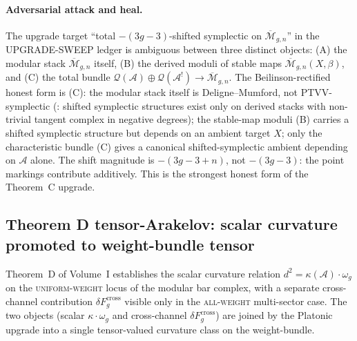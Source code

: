 \documentclass[11pt]{article}
\begin{document}
\paragraph{Adversarial attack and heal.} The upgrade target ``total
$-(3g{-}3)$-shifted symplectic on $\overline{\mathcal{M}}_{g,n}$''
in the UPGRADE-SWEEP ledger is ambiguous between three distinct
objects: (A) the modular stack $\overline{\mathcal{M}}_{g,n}$
itself, (B) the derived moduli of stable maps
$\overline{\mathcal{M}}_{g,n}(X, \beta)$, and (C) the total bundle
$\mathcal{Q}(\mathcal{A}) \oplus \mathcal{Q}(\mathcal{A}^!) \to
\overline{\mathcal{M}}_{g,n}$. The Beilinson-rectified honest form
is (C): the modular stack itself is Deligne--Mumford, not
PTVV-symplectic (\cite[Rem.~2.7]{PTVV13}: shifted symplectic
structures exist only on derived stacks with non-trivial tangent
complex in negative degrees); the stable-map moduli (B) carries
a shifted symplectic structure but depends on an ambient target
$X$; only the characteristic bundle (C) gives a canonical
shifted-symplectic ambient depending on $\mathcal{A}$ alone. The
shift magnitude is $-(3g{-}3{+}n)$, not $-(3g{-}3)$: the point
markings contribute additively. This is the strongest honest form
of the Theorem~C upgrade.

\subsection{Theorem D tensor-Arakelov: scalar curvature promoted to weight-bundle tensor}
\label{subsec:theoremD-tensor-arakelov}

Theorem~D of Volume~I establishes the scalar curvature relation
$d^2 = \kappa(\mathcal{A}) \cdot \omega_g$ on the
\textsc{uniform-weight} locus of the modular bar complex, with a
separate cross-channel contribution
$\delta F_g^{\mathrm{cross}}$ visible only in the
\textsc{all-weight} multi-sector case. The two objects
(scalar $\kappa \cdot \omega_g$ and cross-channel
$\delta F_g^{\mathrm{cross}}$) are joined by the Platonic
upgrade into a single tensor-valued curvature class on the
weight-bundle.
\end{document}
